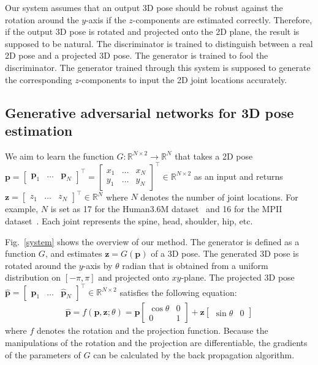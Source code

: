 \documentclass[runningheads]{llncs}
\newcommand{\matsui}[1]{\textbf{\textcolor{cyan}{[\textsc{MATSUI:} #1]}}}
\newcommand{\Fref}[1]{Fig.~\ref{#1}}
\begin{document}
Our system assumes that an output 3D pose should be robust against the rotation around the $y$-axis if the $z$-components are estimated correctly.
Therefore, if the output 3D pose is rotated and projected onto the 2D plane, the result is supposed to be natural.
The discriminator is trained to distinguish between a real 2D pose and a projected 3D pose.
The generator is trained to fool the discriminator.
The generator trained through this system is supposed to generate the corresponding $z$-components to input the 2D joint locations accurately.

\subsection{Generative adversarial networks for 3D pose estimation}
We aim to learn the function $G: \mathbb{R}^{N \times 2} \rightarrow \mathbb{R}^N$ that takes a 2D pose 
${\bm p} =
\begin{bmatrix}
{\bm p}_1 & \dots & {\bm p}_N
\end{bmatrix}^{\top}=
\begin{bmatrix}
x_1 & \dots & x_N \\
y_1 & \dots & y_N
\end{bmatrix}^{\top}
\in \mathbb{R}^{N \times 2}$ 
as an input and returns 
${\bm z}=
\begin{bmatrix}
z_1 & \dots & z_N
\end{bmatrix}^{\top}
\in \mathbb{R}^N$ where $N$ denotes the number of joint locations.
For example, $N$ is set as 17 for the Human3.6M dataset~\cite{ionescu2014human3.6m} and 16 for the MPII dataset~\cite{mpii}. Each joint represents the spine, head, shoulder, hip, etc.

\Fref{system} shows the overview of our method. 
The generator is defined as a function $G$, and estimates ${\bm z}=G({\bm p})$ of a 3D pose.
The generated 3D pose is rotated around the $y$-axis by $\theta$ radian that is obtained from a uniform distribution on $[-\pi, \pi]$ and projected onto $xy$-plane.
The projected 3D pose 
$\hat{\bm p} =
\begin{bmatrix}
\hat{\bm p}_1 & \dots & \hat{\bm p}_N
\end{bmatrix}^{\top} \in \mathbb{R}^{N \times 2}$
satisfies the following equation:
\begin{eqnarray}
  \hat{\bm p} = 
  f({\bm p}, {\bm z}; \theta) = 
  {\bm p}
  \begin{bmatrix}
  \cos \theta & 0 \\
  0 & 1
  \end{bmatrix}
  + {\bm z}
  \begin{bmatrix}
  \sin \theta & 0
  \end{bmatrix}
\end{eqnarray}
where $f$ denotes the rotation and the projection function. Because the manipulations of the rotation and the projection are differentiable, the gradients of the parameters of $G$ can be calculated by the back propagation algorithm.
\end{document}

